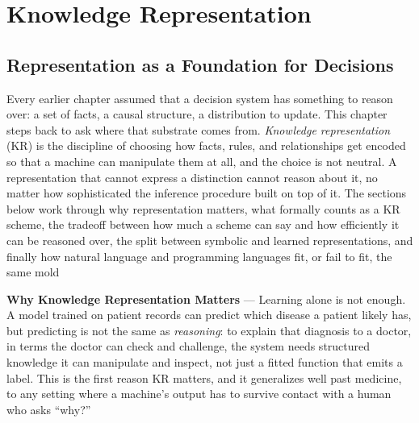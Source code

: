 
\chapter{Knowledge Representation}
\label{chap:knowledge-representation}


\section{Representation as a Foundation for Decisions}
\label{sec:representation-foundation-decisions}

Every earlier chapter assumed that a decision system has something to reason
over: a set of facts, a causal structure, a distribution to update. This chapter
steps back to ask where that substrate comes from. \emph{Knowledge representation}
(KR) is the discipline of choosing how facts, rules, and relationships get
encoded so that a machine can manipulate them at all, and the choice is not
neutral. A representation that cannot express a distinction cannot reason
about it, no matter how sophisticated the inference procedure built on top of
it. The sections below work through why representation matters, what
formally counts as a KR scheme, the tradeoff between how much a scheme can say
and how efficiently it can be reasoned over, the split between symbolic and
learned representations, and finally how natural language and programming
languages fit, or fail to fit, the same mold

\textbf{Why Knowledge Representation Matters} --- Learning alone is not
enough. A model trained on patient records can predict which disease a
patient likely has, but predicting is not the same as \emph{reasoning}: to
explain that diagnosis to a doctor, in terms the doctor can check and
challenge, the system needs structured knowledge it can manipulate and
inspect, not just a fitted function that emits a label. This is the first
reason KR matters, and it generalizes well past medicine, to any setting
where a machine's output has to survive contact with a human who asks
``why?''

